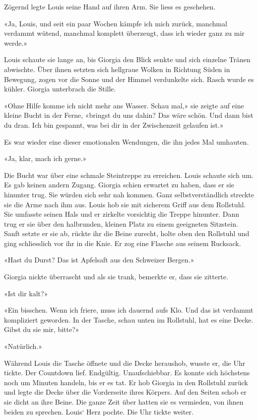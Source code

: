 Zögernd legte Louis seine Hand auf ihren Arm. Sie liess es geschehen.

«Ja, Louis, und seit ein paar Wochen kämpfe ich mich zurück, manchmal
verdammt wütend, manchmal komplett überzeugt, dass ich wieder ganz zu
mir werde.»

Louis schaute sie lange an, bis Giorgia den Blick senkte und sich
einzelne Tränen abwischte.
Über ihnen setzten sich hellgraue Wolken in Richtung Süden in Bewegung, zogen vor die Sonne und der Himmel verdunkelte sich. Rasch wurde es kühler. Giorgia unterbrach die Stille.

«Ohne Hilfe komme ich nicht mehr ans Wasser. Schau mal,» sie zeigte auf
eine kleine Bucht in der Ferne, «bringst du uns dahin? Das wäre schön.
Und dann bist du dran. Ich bin gespannt, was bei dir in der Zwischenzeit
gelaufen ist.»

Es war wieder eine dieser emotionalen Wendungen, die ihn jedes Mal
umhauten.

«Ja, klar, mach ich gerne.»

Die Bucht war über eine schmale Steintreppe zu erreichen. Louis schaute
sich um. Es gab keinen andern Zugang. Giorgia schien erwartet zu haben,
dass er sie hinunter trug. Sie würden sich sehr nah kommen. Ganz
selbstverständlich streckte sie die Arme nach ihm aus. 
Louis hob sie mit sicherem Griff aus dem Rollstuhl. Sie umfasste seinen
Hals und er zirkelte vorsichtig die Treppe hinunter. Dann trug er
sie über den halbrunden, kleinen Platz zu einem geeigneten
Sitzstein. Sanft setzte er sie ab, rückte ihr die Beine zurecht, holte
oben den Rollstuhl und ging schliesslich vor ihr in die Knie. Er zog
eine Flasche aus seinem Rucksack. 

«Hast du Durst? Das ist Apfelsaft aus den Schweizer Bergen.»

Giorgia nickte überrascht und als sie trank, bemerkte er, dass sie zitterte.

«Ist dir kalt?»

«Ein bisschen. Wenn ich friere, muss ich dauernd aufs Klo. Und das ist
verdammt kompliziert geworden. In der Tasche, schau unten im Rollstuhl, 
hat es eine Decke. Gibst du sie mir, bitte?»

«Natürlich.»

Während Louis die Tasche öffnete und die Decke heraushob, wusste er, die Uhr tickte. Der Countdown lief.
Endgültig. Unaufschiebbar. Es konnte sich höchstens noch um Minuten handeln, bis er es tat.
Er hob Giorgia in den Rollstuhl zurück und legte die Decke über die Vorderseite ihres Körpers. 
Auf den Seiten schob er sie dicht an ihre Beine.
Die ganze Zeit über hatten sie es vermieden, von ihnen beiden zu
sprechen. Louis` Herz pochte. Die Uhr tickte weiter.

